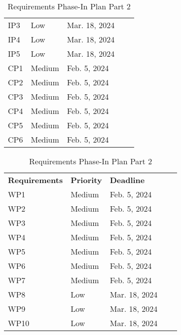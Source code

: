 \documentclass[12pt]{article}
\begin{document}
\begin{table}[H]
\begin{tabular}{|l|l|l|ll}
IP3         & Low   & Mar. 18, 2024      &  &  \\ \cline{1-3}
IP4         & Low   & Mar. 18, 2024      &  &  \\ \cline{1-3}
IP5         & Low   & Mar. 18, 2024      &  &  \\ \cline{1-3}
CP1         & Medium   & Feb. 5, 2024      &  &  \\ \cline{1-3}
CP2         & Medium   & Feb. 5, 2024      &  &  \\ \cline{1-3}
CP3         & Medium   & Feb. 5, 2024      &  &  \\ \cline{1-3}
CP4         & Medium   & Feb. 5, 2024      &  &  \\ \cline{1-3}
CP5         & Medium   & Feb. 5, 2024      &  &  \\ \cline{1-3}
CP6         & Medium   & Feb. 5, 2024      &  &  \\ \cline{1-3}
\end{tabular}
\caption{Requirements Phase-In Plan Part 2}
\end{table}

\begin{table}[H]
\centering
\begin{tabular}{|l|l|l|ll}
\cline{1-3}
\textbf{Requirements} & \textbf{Priority} & \textbf{Deadline} &  &  \\ \cline{1-3}
WP1         & Medium   & Feb. 5, 2024      &  &  \\ \cline{1-3}
WP2         & Medium   & Feb. 5, 2024      &  &  \\ \cline{1-3}
WP3         & Medium   & Feb. 5, 2024      &  &  \\ \cline{1-3}
WP4         & Medium   & Feb. 5, 2024      &  &  \\ \cline{1-3}
WP5         & Medium   & Feb. 5, 2024      &  &  \\ \cline{1-3}
WP6         & Medium   & Feb. 5, 2024      &  &  \\ \cline{1-3}
WP7         & Medium   & Feb. 5, 2024      &  &  \\ \cline{1-3}
WP8         & Low   & Mar. 18, 2024      &  &  \\ \cline{1-3}
WP9         & Low   & Mar. 18, 2024      &  &  \\ \cline{1-3}
WP10         & Low   & Mar. 18, 2024      &  &  \\ \cline{1-3}
\end{tabular}
\caption{Requirements Phase-In Plan Part 2}
\end{table}
\end{document}

